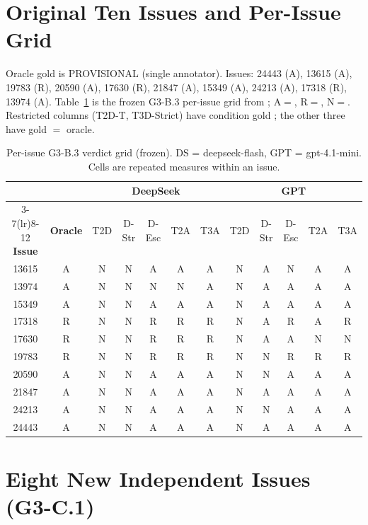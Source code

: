 \section{Original Ten Issues and Per-Issue Grid}
\label{app:issues}

Oracle gold is PROVISIONAL (single annotator). Issues: 24443 (A), 13615 (A),
19783 (R), 20590 (A), 17630 (R), 21847 (A), 15349 (A), 24213 (A), 17318 (R),
13974 (A). Table~\ref{tab:t1} is the frozen G3-B.3 per-issue grid from
; A$=$\ACCEPT,
R$=$\REJECT, N$=$\NEED. Restricted columns (T2D-T, T3D-Strict) have condition
gold \NEED; the other three have gold $=$ oracle.

\begin{table}[h]
\centering
\scriptsize
\setlength{\tabcolsep}{3.2pt}
\caption{Per-issue G3-B.3 verdict grid (frozen). DS = deepseek-flash,
GPT = gpt-4.1-mini. Cells are repeated measures within an issue.}
\label{tab:t1}
\begin{tabular}{c c ccccc ccccc}
\toprule
 & & \multicolumn{5}{c}{\textbf{DeepSeek}} & \multicolumn{5}{c}{\textbf{GPT}} \\
\cmidrule(lr){3-7}\cmidrule(lr){8-12}
\textbf{Issue} & \textbf{Oracle} & T2D & D-Str & D-Esc & T2A & T3A & T2D & D-Str & D-Esc & T2A & T3A \\
\midrule
13615 & A & N & N & A & A & A & N & A & N & A & A \\
13974 & A & N & N & N & N & A & N & A & A & A & A \\
15349 & A & N & N & A & A & A & N & A & A & A & A \\
17318 & R & N & N & R & R & R & N & A & R & A & R \\
17630 & R & N & N & R & R & R & N & A & A & N & N \\
19783 & R & N & N & R & R & R & N & N & R & R & R \\
20590 & A & N & N & A & A & A & N & N & A & A & A \\
21847 & A & N & N & A & A & A & N & A & A & A & A \\
24213 & A & N & N & A & A & A & N & N & A & A & A \\
24443 & A & N & N & A & A & A & N & A & A & A & A \\
\bottomrule
\end{tabular}
\end{table}

\section{Eight New Independent Issues (G3-C.1)}
\label{app:pilot}

